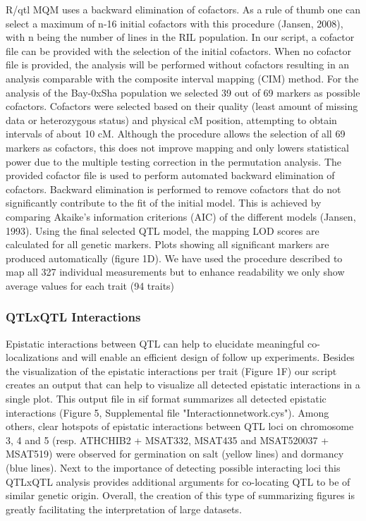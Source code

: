 \documentclass[8pt, twoside, a5paper]{report}
\begin{document}
R/qtl MQM uses a backward elimination of cofactors. As a rule of thumb one can select a maximum of n-16 initial cofactors with this procedure (Jansen, 2008), with n
being the number of lines in the RIL population. In our script, a cofactor file can be provided with the selection of the initial cofactors. When no cofactor file is provided, the
analysis will be performed without cofactors resulting in an analysis comparable with the composite interval mapping (CIM) method. For the analysis of the Bay-0xSha population
we selected 39 out of 69 markers as possible cofactors. Cofactors were selected based on their quality (least amount of missing data or heterozygous status) and physical cM
position, attempting to obtain intervals of about 10 cM. Although the procedure allows the selection of all 69 markers as cofactors, this does not improve mapping and only lowers
statistical power due to the multiple testing correction in the permutation analysis. The provided cofactor file is used to perform automated backward elimination of cofactors.
Backward elimination is performed to remove cofactors that do not significantly contribute to the fit of the initial model. This is achieved by comparing Akaike’s information criterions
(AIC) of the different models (Jansen, 1993). Using the final selected QTL model, the mapping LOD scores are calculated for all genetic markers. Plots showing all significant
markers are produced automatically (figure 1D). We have used the procedure described to map all 327 individual measurements but to enhance
readability we only show average values for each trait (94 traits)

\subsubsection{QTLxQTL Interactions}
Epistatic interactions between QTL can help to elucidate meaningful co-localizations and will enable an efficient design of follow up experiments. Besides the
visualization of the epistatic interactions per trait (Figure 1F) our script creates an output that can help to visualize all detected epistatic interactions in a single plot. This output file
in sif format summarizes all detected epistatic interactions (Figure 5, Supplemental file "Interactionnetwork.cys"). Among others, clear hotspots of epistatic interactions between
QTL loci on chromosome 3, 4 and 5 (resp. ATHCHIB2 + MSAT332, MSAT435 and MSAT520037 + MSAT519) were observed for germination on salt (yellow lines) and
dormancy (blue lines). Next to the importance of detecting possible interacting loci this QTLxQTL analysis provides additional arguments for co-locating QTL to be of similar
genetic origin. Overall, the creation of this type of summarizing figures is greatly facilitating the interpretation of large datasets.
\end{document}
